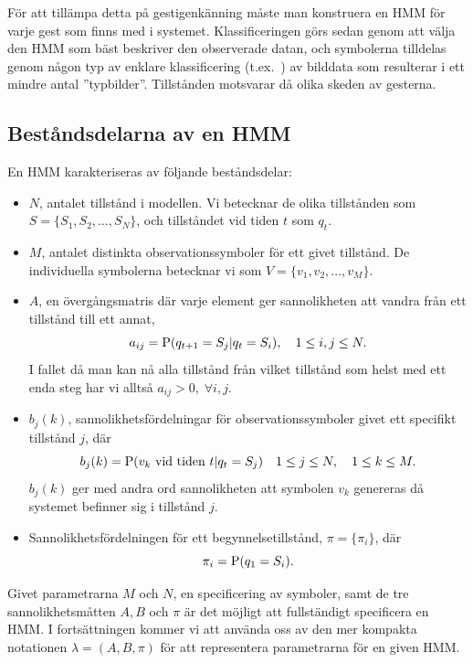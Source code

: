 \documentclass[../rapport_MVEX01-11-05]{subfiles}
\begin{document}
\newpage
För att tillämpa detta på gestigenkänning måste man konstruera en HMM
för varje gest som finns med i systemet. Klassificeringen görs sedan genom
att välja den HMM som bäst beskriver den observerade datan, och symbolerna
tilldelas genom någon typ av enklare klassificering (t.ex.~\knn) av bilddata
som resulterar i ett mindre antal ''typbilder''. Tillstånden motsvarar
då olika skeden av gesterna.


\subsection{Beståndsdelarna av en HMM}
En HMM karakteriseras av följande beståndsdelar:
\begin{itemize}
\item $N$, antalet tillstånd i modellen. Vi betecknar de olika
  tillstånden som $S = \{S_1, S_2, \dots, S_N\}$, och tillståndet vid
  tiden $t$ som $q_t$.
\item $M$, antalet distinkta observationssymboler för ett givet
  tillstånd. De individuella symbolerna betecknar vi som $V =
  \{v_1,v_2,\dots,v_M\}$.
\item $A$, en övergångsmatris där varje element ger sannolikheten att
  vandra från ett tillstånd till ett annat, 
\begin{equation*}
a_{ij} = \mathrm{P}(q_{t+1} = S_j|q_t = S_i),\quad 1 \leq i,j \leq N.
\end{equation*}
I fallet då man kan nå alla tillstånd från vilket tillstånd som helst
med ett enda steg har vi alltså $a_{ij} > 0,\;\forall i,j$. 
\item $b_j(k)$, sannolikhetsfördelningar för observationssymboler givet ett
  specifikt tillstånd $j$, där 
\begin{equation*}
b_j(k) = \mathrm{P}(v_k \text{ vid tiden } t|q_t = S_j) \quad 1 \leq j \leq N,\quad1 \leq k \leq M.
\end{equation*}
$b_j(k)$ ger med andra ord sannolikheten att symbolen $v_k$ genereras
då systemet befinner sig i tillstånd $j$.
\item Sannolikhetsfördelningen för ett begynnelsetillstånd, $\pi =
  \{\pi_i\}$, där
\begin{equation*}
\pi_i = \mathrm{P}(q_1 = S_i).
\end{equation*}
\end{itemize}
Givet parametrarna $M$ och $N$, en specificering av symboler, samt de
tre sannolikhetsmåtten $A, B$ och $\pi$ är det möjligt att
fullständigt specificera en HMM. I fortsättningen kommer vi att
använda oss av den mer kompakta notationen $\lambda = (A,B,\pi)$
för att representera parametrarna för en given HMM.
\end{document}
